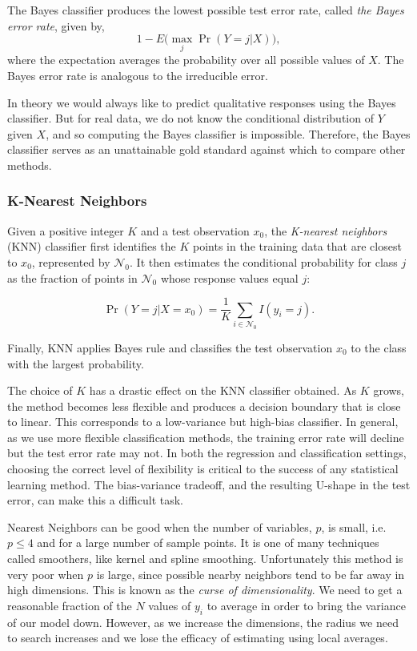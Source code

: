 \documentclass{article}
\numberwithin{equation}{section}
\begin{document}
The Bayes classifier produces the lowest possible test error rate, called \textit{the Bayes error rate}, given by,
\begin{equation}
1 - E \Bigg( \max_j \Pr(Y = j|X) \Bigg ),
\end{equation}
where the expectation averages the probability over all possible values of $X$. The Bayes error rate is analogous to the irreducible error.

In theory we would always like to predict qualitative responses using the Bayes classifier. But for real data, we do not know the conditional distribution of $Y$ given $X$, and so computing the Bayes classifier is impossible. Therefore, the Bayes classifier serves as an unattainable gold standard against which to compare other methods.

\subsubsection{K-Nearest Neighbors}
Given a positive integer $K$ and a test observation $x_0$, the \textit{K-nearest neighbors} (KNN) classifier first identifies the $K$ points in the training data that are closest to $x_0$, represented by $\mathcal N_0$. It then estimates the conditional probability for class $j$ as the fraction of points in $\mathcal N_0$ whose response values equal $j$:

\begin{equation}
    \Pr(Y = j|X = x_0) = \frac{1}{K} \sum_{i \in \mathcal N_0} I(y_i = j).
\end{equation}

Finally, KNN applies Bayes rule and classifies the test observation $x_0$ to the class with the largest probability.

The choice of $K$ has a drastic effect on the KNN classifier obtained. As $K$ grows, the method becomes less flexible and produces a decision boundary that is close to linear. This corresponds to a low-variance but high-bias classifier. In
general, as we use more flexible classification methods, the training error rate will decline but the test error rate may not. In both the regression and classification settings, choosing the correct level of flexibility is critical to the success of any statistical learning method. The bias-variance tradeoff, and the resulting U-shape in the test error, can make this a difficult task. 

Nearest Neighbors can be good when the number of variables, $p$, is small, i.e. $p \leq 4$ and for a large number of sample points. It is one of many techniques called smoothers, like kernel and spline smoothing. Unfortunately this method is very poor when $p$ is large, since possible nearby neighbors tend to be far away in high dimensions. This is known as the \textit{curse of dimensionality}. We need to get a reasonable fraction of the $N$ values of $y_i$ to average in order to bring the variance of our model down. However, as we increase the dimensions, the radius we need to search increases and we lose the efficacy of estimating using local averages.
\end{document}
